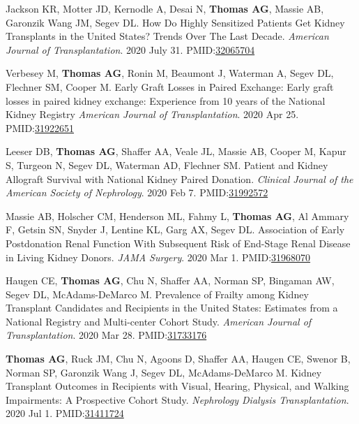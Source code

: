 \documentclass[10pt]{article}
\makeatletter
\newlength{\bibhang}
\newlength{\bibsep}
 {\@listi \global\bibsep\itemsep \global\advance\bibsep by\parsep}
\newenvironment{bibenum*}
  {\renewcommand\labelenumi{[\theenumi]}%
   \etaremune[
     topsep=0pt,
     itemsep=\bibsep,
     parsep=0pt,partopsep=0pt,
     itemindent=-\bibhang,
     leftmargin={\bibhang+\widthof{[999]}}]}
  {\endetaremune}
\newcommand{\pmid}[1]{PMID:\href{https://www.ncbi.nlm.nih.gov/pubmed/#1}{#1}}
\makeatother
\begin{document}
\begin{bibenum*}
\item Jackson KR\dag, Motter JD\dag, Kernodle A, Desai N, \textbf{Thomas AG},
 Massie AB, Garonzik Wang JM, Segev DL.
 How Do Highly Sensitized Patients Get Kidney Transplants in the
 United States? Trends Over The Last Decade.
 \emph{American Journal of Transplantation}. 2020 July 31.
 \pmid{32065704} 

\item Verbesey M, \textbf{Thomas AG}, Ronin M, Beaumont J, Waterman A,
  Segev DL, Flechner SM, Cooper M. Early Graft Losses in Paired Exchange:
  Early graft losses in paired kidney exchange: Experience from 
  10 years of the National Kidney Registry 
  \emph{American Journal of Transplantation}. 2020 Apr 25.
  \pmid{31922651} 

\item Leeser DB, \textbf{Thomas AG}, Shaffer AA, Veale JL,
  Massie AB, Cooper M,
  Kapur S, Turgeon N, Segev DL, Waterman AD, Flechner SM.
  Patient and Kidney Allograft Survival with National Kidney Paired Donation.
  \emph{Clinical Journal of the American Society of Nephrology}. 2020 Feb 7.
  \pmid{31992572} 

\item Massie AB, Holscher CM, Henderson ML, Fahmy L, \textbf{Thomas AG},
  Al Ammary F, Getsin SN, Snyder J, Lentine KL, Garg AX, Segev DL.
  Association of Early Postdonation Renal Function With Subsequent 
  Risk of End-Stage Renal Disease in Living Kidney Donors.
 \emph{JAMA Surgery}. 2020 Mar 1.
 \pmid{31968070} 

\item Haugen CE\dag, \textbf{Thomas AG\dag}, Chu N, Shaffer AA, Norman SP,
  Bingaman AW, Segev DL, McAdams-DeMarco M.
  Prevalence of Frailty among Kidney Transplant Candidates and Recipients
  in the United States: Estimates from a National Registry and Multi-center
  Cohort Study.
  \emph{American Journal of Transplantation}. 2020 Mar 28.
  \pmid{31733176} 

\item \textbf{Thomas AG}, Ruck JM, Chu N, Agoons D, Shaffer AA, Haugen CE,
  Swenor B, Norman SP, Garonzik Wang J, Segev DL, McAdams-DeMarco M.
  Kidney Transplant Outcomes in Recipients with Visual, Hearing,
  Physical, and Walking Impairments: A Prospective Cohort Study.
  \emph{Nephrology Dialysis Transplantation}. 2020 Jul 1.
  \pmid{31411724} 


\end{bibenum*}
\end{document}
